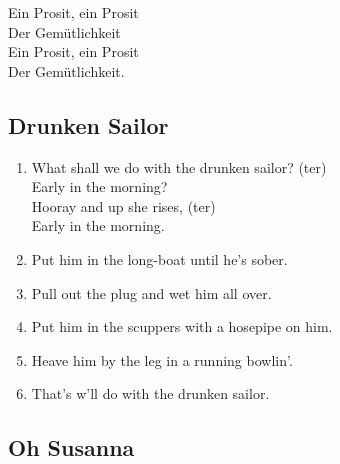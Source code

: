 \documentclass[a5paper]{article}
\begin{document}
Ein Prosit, ein Prosit \\
Der Gemütlichkeit \\
Ein Prosit, ein Prosit \\
Der Gemütlichkeit.\\

\newpage

\subsection{Drunken Sailor} %
\label{sub:drunken_sailor}


\begin{enumerate}
	\item What shall we do with the drunken sailor? (ter)\\
	Early in the morning?\\
	Hooray and up she rises, (ter)\\
	Early in the morning.\\
	\item Put him in the long-boat until he's sober.\\
	\item Pull out the plug and wet him all over.\\
	\item Put him in the scuppers with a hosepipe on him.\\
	\item Heave him by the leg in a running bowlin'.\\
	\item That's w'll do with the drunken sailor.\\
\end{enumerate}



\newpage

\subsection{Oh Susanna} %
\label{sub:oh_susanna}
\end{document}

